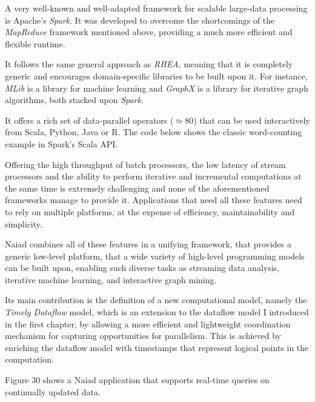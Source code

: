 \documentclass{dithesis}
\begin{document}
A very well-known and well-adapted framework for scalable large-data processing is Apache's \textit{Spark}. It was developed to overcome the shortcomings of the \textit{MapReduce} framework mentioned above, providing a much more efficient and flexible runtime.

It follows the same general approach as \textit{RHEA}, meaning that it is completely generic and encourages domain-specific libraries to be built upon it. For instance, \textit{MLib} is a library for machine learning and \textit{GraphX} is a library for iterative graph algorithms, both stacked upon \textit{Spark}.

It offers a rich set of data-parallel operators ($\simeq 80$) that can be used interactively from Scala, Python, Java or R. The code below shows the classic word-counting example in Spark's Scala API.



Offering the high throughput of batch processors, the low latency of stream processors and the ability to perform iterative and incremental computations at the same time is extremely challenging and none of the aforementioned frameworks manage to provide it. Applications that need all these features need to rely on multiple platforms, at the expense of efficiency, maintainability and simplicity.

Naiad\cite{naiad} combines all of these features in a unifying framework, that provides a generic low-level platform, that a wide variety of high-level programming models can be built upon, enabling such diverse tasks as streaming data analysis, iterative machine learning, and interactive graph mining.

Its main contribution is the definition of a new computational model, namely the \textit{Timely Dataflow} model, which is an extension to the dataflow model I introduced in the first chapter, by allowing a more efficient and lightweight coordination mechanism for capturing opportunities for parallelism. This is achieved by enriching the dataflow model with timestamps that represent logical points in the computation.

Figure 30 shows a Naiad application that supports real-time queries on continually updated data.

\end{document}
